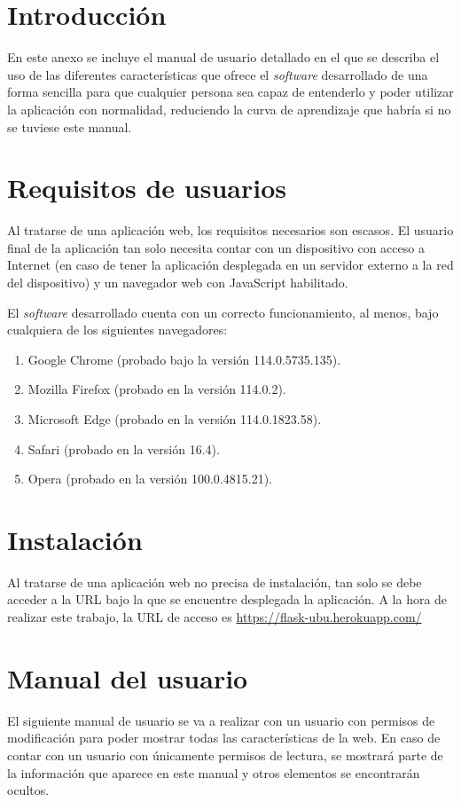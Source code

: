 
\section{Introducción}
En este anexo se incluye el manual de usuario detallado en el que se describa el uso de las diferentes características que ofrece el \textit{software} desarrollado de una forma sencilla para que cualquier persona sea capaz de entenderlo y poder utilizar la aplicación con normalidad, reduciendo la curva de aprendizaje que habría si no se tuviese este manual.

\section{Requisitos de usuarios}
Al tratarse de una aplicación web, los requisitos necesarios son escasos.
El usuario final de la aplicación tan solo necesita contar con un dispositivo con acceso a Internet (en caso de tener la aplicación desplegada en un servidor externo a la red del dispositivo) y un navegador web con JavaScript habilitado.

El \textit{software} desarrollado cuenta con un correcto funcionamiento, al menos, bajo cualquiera de los siguientes navegadores:

\begin{enumerate}
\item Google Chrome (probado bajo la versión 114.0.5735.135).
\item Mozilla Firefox (probado en la versión 114.0.2).
\item Microsoft Edge (probado en la versión 114.0.1823.58).
\item Safari (probado en la versión 16.4).
\item Opera (probado en la versión 100.0.4815.21).
\end{enumerate}

\section{Instalación}
Al tratarse de una aplicación web no precisa de instalación, tan solo se debe acceder a la URL bajo la que se encuentre desplegada la aplicación. 
A la hora de realizar este trabajo, la URL de acceso es \url{https://flask-ubu.herokuapp.com/}

\section{Manual del usuario}
El siguiente manual de usuario se va a realizar con un usuario con permisos de modificación para poder mostrar todas las características de la web.
En caso de contar con un usuario con únicamente permisos de lectura, se mostrará parte de la información que aparece en este manual y otros elementos se encontrarán ocultos.

